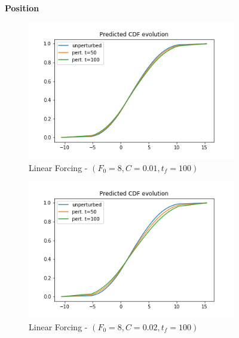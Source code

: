 \documentclass{article}
\begin{document}
\begin{figure}[!ht]
	\centering
	\textbf{Position}\par\medskip
	\begin{subfigure}[b]{0.48\textwidth}
		\includegraphics[width=1\linewidth]{fig/pred_cdf_position_below_L_001_100.png}
		\caption{Linear Forcing - $(F_0=8, C=0.01, t_f=100)$}
		\label{fig:pred_cdf_position_below_L_001_100}
	\end{subfigure}%
	\begin{subfigure}[b]{0.48\textwidth}
		\includegraphics[width=1\linewidth]{fig/pred_cdf_position_below_L_002_100.png}
		\caption{Linear Forcing - $(F_0=8, C=0.02, t_f=100)$}
		\label{fig:pred_cdf_position_below_L_001_200}
	\end{subfigure}
	\begin{subfigure}[b]{0.48\textwidth}

\end{subfigure}
\end{figure}
\end{document}
